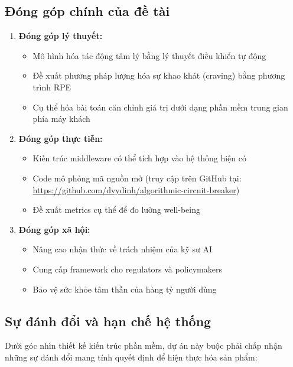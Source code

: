 \subsection{Đóng góp chính của đề tài}

\begin{enumerate}
    \item \textbf{Đóng góp lý thuyết:}
    \begin{itemize}
        \item Mô hình hóa tác động tâm lý bằng lý thuyết điều khiển tự động
        \item Đề xuất phương pháp lượng hóa sự khao khát (craving) bằng phương trình RPE
        \item Cụ thể hóa bài toán căn chỉnh giá trị dưới dạng phần mềm trung gian phía máy khách
    \end{itemize}
    
    \item \textbf{Đóng góp thực tiễn:}
    \begin{itemize}
        \item Kiến trúc middleware có thể tích hợp vào hệ thống hiện có
        \item Code mô phỏng mã nguồn mở (truy cập trên GitHub tại: \href{https://github.com/dvydinh/algorithmic-circuit-breaker}{https://github.com/dvydinh/algorithmic-circuit-breaker})
        \item Đề xuất metrics cụ thể để đo lường well-being
    \end{itemize}
    
    \item \textbf{Đóng góp xã hội:}
    \begin{itemize}
        \item Nâng cao nhận thức về trách nhiệm của kỹ sư AI
        \item Cung cấp framework cho regulators và policymakers
        \item Bảo vệ sức khỏe tâm thần của hàng tỷ người dùng
    \end{itemize}
\end{enumerate}

\subsection{Sự đánh đổi và hạn chế hệ thống}

Dưới góc nhìn thiết kế kiến trúc phần mềm, dự án này buộc phải chấp nhận những sự đánh đổi mang tính quyết định để hiện thực hóa sản phẩm:

